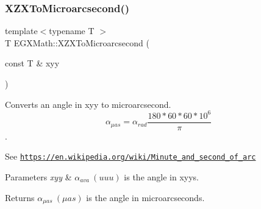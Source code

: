 \subsubsection{\texorpdfstring{X\+Z\+X\+To\+Microarcsecond()}{XZXToMicroarcsecond()}}
{\footnotesize\ttfamily template$<$typename T $>$ \\
T E\+G\+X\+Math\+::\+X\+Z\+X\+To\+Microarcsecond (\begin{DoxyParamCaption}\item[{const T \&}]{xyy }\end{DoxyParamCaption})}



Converts an angle in xyy to microarcsecond. \[\alpha_{\mu as}=\alpha_{rad}\frac{180 * 60 * 60 * 10^6}{\pi}\]. 

See \href{https://en.wikipedia.org/wiki/Minute_and_second_of_arc}{\tt https\+://en.\+wikipedia.\+org/wiki/\+Minute\+\_\+and\+\_\+second\+\_\+of\+\_\+arc} 
\begin{DoxyParams}{Parameters}
{\em xyy} & $\alpha_{ava}\ (uuu)$ is the angle in xyys. \\
\hline
\end{DoxyParams}
\begin{DoxyReturn}{Returns}
$\alpha_{\mu as}\ (\mu as)$ is the angle in microarcseconds. 
\end{DoxyReturn}
